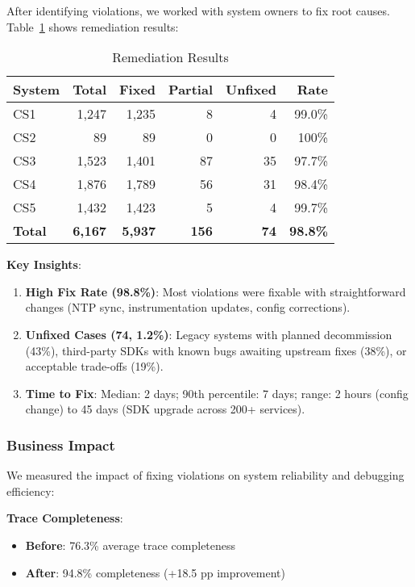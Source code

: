 After identifying violations, we worked with system owners to fix root causes. Table~\ref{tab:remediation} shows remediation results:

\begin{table}[t]
\caption{Remediation Results}
\label{tab:remediation}
\small
\begin{tabular}{lrrrrr}
\toprule
\textbf{System} & \textbf{Total} & \textbf{Fixed} & \textbf{Partial} & \textbf{Unfixed} & \textbf{Rate} \\
\midrule
CS1 & 1,247 & 1,235 & 8 & 4 & 99.0\% \\
CS2 & 89 & 89 & 0 & 0 & 100\% \\
CS3 & 1,523 & 1,401 & 87 & 35 & 97.7\% \\
CS4 & 1,876 & 1,789 & 56 & 31 & 98.4\% \\
CS5 & 1,432 & 1,423 & 5 & 4 & 99.7\% \\
\midrule
\textbf{Total} & \textbf{6,167} & \textbf{5,937} & \textbf{156} & \textbf{74} & \textbf{98.8\%} \\
\bottomrule
\end{tabular}
\vspace{-0.1in}
\end{table}

\textbf{Key Insights}:

\begin{enumerate}
\item \textbf{High Fix Rate (98.8\%)}: Most violations were fixable with straightforward changes (NTP sync, instrumentation updates, config corrections).

\item \textbf{Unfixed Cases (74, 1.2\%)}: Legacy systems with planned decommission (43\%), third-party SDKs with known bugs awaiting upstream fixes (38\%), or acceptable trade-offs (19\%).

\item \textbf{Time to Fix}: Median: 2 days; 90th percentile: 7 days; range: 2 hours (config change) to 45 days (SDK upgrade across 200+ services).
\end{enumerate}

\subsubsection{Business Impact}

We measured the impact of fixing violations on system reliability and debugging efficiency:

\textbf{Trace Completeness}:
\begin{itemize}
\item \textbf{Before}: 76.3\% average trace completeness
\item \textbf{After}: 94.8\% completeness (+18.5 pp improvement)
\end{itemize}

